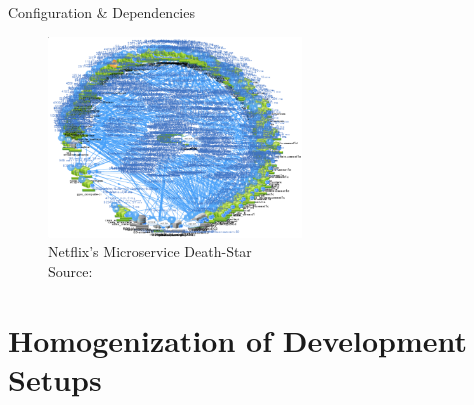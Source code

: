 \documentclass{beamer}
\begin{document}
\begin{frame}{}
  \begin{center}
    \Large Configuration \& Dependencies
  \end{center}
  \begin{figure}
    \includegraphics[width=0.6\textwidth]{img/netfix.png}
    \caption{\footnotesize Netflix's Microservice Death-Star \\\textcolor{uos-grey-full}{Source: {\cite{deathstar}}}}
  \end{figure}
\end{frame}


\section{Homogenization of Development Setups}
\end{document}
